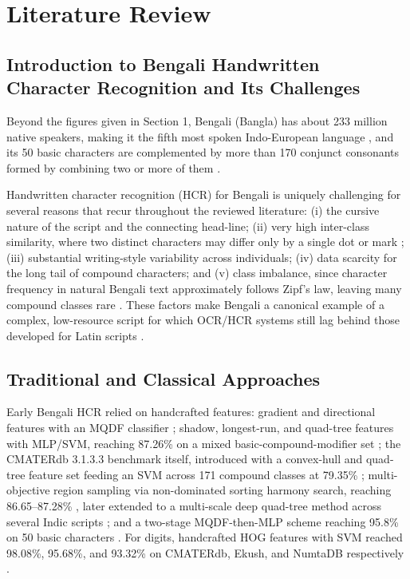 \hypertarget{literature-review}{%
\section{Literature Review}\label{literature-review}}

\hypertarget{introduction-to-bangla-handwritten-character-recognition-and-its-challenges}{%
\subsection{Introduction to Bengali Handwritten Character Recognition
and Its
Challenges}\label{introduction-to-bangla-handwritten-character-recognition-and-its-challenges}}

Beyond the figures given in Section 1, Bengali (Bangla) has about 233 million native speakers, making it the fifth most spoken Indo-European language \citep{ekushnetnote}, and its 50 basic characters are complemented by more than 170 conjunct consonants formed by combining two or more of them \citep{ref7}.

Handwritten character recognition (HCR) for Bengali is uniquely
challenging for several reasons that recur throughout the reviewed
literature: (i) the cursive nature of the script and the connecting
head-line; (ii) very high inter-class similarity, where two
distinct characters may differ only by a single dot or mark \citep{ref32};
(iii) substantial writing-style variability across individuals; (iv)
data scarcity for the long tail of compound characters; and (v) class
imbalance, since character frequency in natural Bengali text
approximately follows Zipf's law, leaving many compound classes rare
\citep{ref33}. These factors make Bengali a canonical example of a complex,
low-resource script for which OCR/HCR systems still lag behind those
developed for Latin scripts \citep{ref21,ref26}.

\hypertarget{traditional-and-classical-approaches}{%
\subsection{Traditional and Classical
Approaches}\label{traditional-and-classical-approaches}}

Early Bengali HCR relied on handcrafted features: gradient and
directional features with an MQDF classifier \citep{ref1}; shadow,
longest-run, and quad-tree features with MLP/SVM, reaching 87.26\% on a
mixed basic-compound-modifier set \citep{ref2}; the CMATERdb 3.1.3.3
benchmark itself, introduced with a convex-hull and quad-tree feature
set feeding an SVM across 171 compound classes at 79.35\% \citep{ref3};
multi-objective region sampling via non-dominated sorting harmony
search, reaching 86.65--87.28\% \citep{ref4}, later extended to a
multi-scale deep quad-tree method across several Indic scripts
\citep{ref5}; and a two-stage MQDF-then-MLP scheme reaching 95.8\% on 50
basic characters \citep{ref6}. For digits, handcrafted HOG features with
SVM reached 98.08\%, 95.68\%, and 93.32\% on CMATERdb, Ekush, and
NumtaDB respectively \citep{ref34}.

